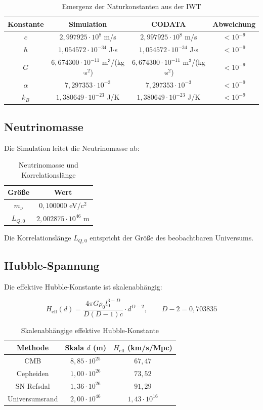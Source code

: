 \documentclass[12pt,a4paper]{article}
\begin{document}
\begin{table}[H]
\centering
\begin{tabular}{c|c|c|c}
Konstante & Simulation & CODATA & Abweichung \\
\hline
$c$ & $2,997925 \cdot 10^8$ m/s & $2,997925 \cdot 10^8$ m/s & $< 10^{-9}$ \\
$\hbar$ & $1,054572 \cdot 10^{-34}$ J$\cdot$s & $1,054572 \cdot 10^{-34}$ J$\cdot$s & $< 10^{-9}$ \\
$G$ & $6,674300 \cdot 10^{-11}$ m$^3$/(kg$\cdot$s$^2$) & $6,674300 \cdot 10^{-11}$ m$^3$/(kg$\cdot$s$^2$) & $< 10^{-9}$ \\
$\alpha$ & $7,297353 \cdot 10^{-3}$ & $7,297353 \cdot 10^{-3}$ & $< 10^{-9}$ \\
$k_B$ & $1,380649 \cdot 10^{-23}$ J/K & $1,380649 \cdot 10^{-23}$ J/K & $< 10^{-9}$ \\
\end{tabular}
\caption{Emergenz der Naturkonstanten aus der IWT}
\label{tab:constants}
\end{table}

\subsection{Neutrinomasse}

Die Simulation leitet die Neutrinomasse ab:

\begin{table}[H]
\centering
\begin{tabular}{c|c}
Größe & Wert \\
\hline
$m_\nu$ & $0,100000$ eV/c$^2$ \\
$L_{Q,0}$ & $2,002875 \cdot 10^{46}$ m \\
\end{tabular}
\caption{Neutrinomasse und Korrelationslänge}
\label{tab:neutrino}
\end{table}

Die Korrelationslänge $L_{Q,0}$ entspricht der Größe des beobachtbaren Universums.

\subsection{Hubble-Spannung}

Die effektive Hubble-Konstante ist skalenabhängig:

\[
H_{\text{eff}}(d) = \frac{4\pi G \rho_0 l_0^{3-D}}{D(D-1)c} \cdot d^{D-2}, \qquad D-2 = 0,703835
\]

\begin{table}[H]
\centering
\begin{tabular}{c|c|c}
Methode & Skala $d$ (m) & $H_{\text{eff}}$ (km/s/Mpc) \\
\hline
CMB & $8,85 \cdot 10^{25}$ & $67,47$ \\
Cepheiden & $1,00 \cdot 10^{26}$ & $73,52$ \\
SN Refsdal & $1,36 \cdot 10^{26}$ & $91,29$ \\
Universumsrand & $2,00 \cdot 10^{46}$ & $1,43 \cdot 10^{16}$ \\
\end{tabular}
\caption{Skalenabhängige effektive Hubble-Konstante}
\label{tab:hubble}
\end{table}
\end{document}
